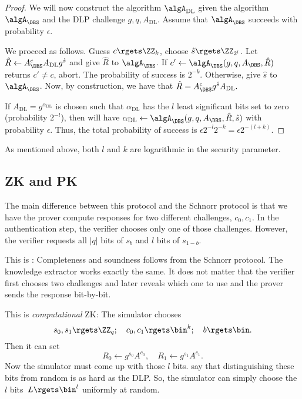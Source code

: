 \begin{proof}
  We will now construct the algorithm \(\algA_{\text{DL}}\) given the algorithm 
  \(\algA_{\DBS}\) and the \ac{DLP} challenge \(g, q, A_{\text{DL}}\).
  Assume that \(\algA_{\DBS}\) succeeds with probability \(\epsilon\).

  We proceed as follows.
  Guess \(c\rgets \ZZ_k\), choose \(\hat s\rgets \ZZ_{2^l}\).
  Let \(\hat R\gets A_{\DBS}^c A_{\text{DL}} g^{\hat s}\) and give
  \(\hat R\) to \(\algA_{\DBS}\).
  If \(c'\gets \algA_{\DBS}(g, q, A_{\DBS}, \hat R)\) returns \(c'\neq c\), 
  abort.
  The probability of success is \(2^{-k}\).
  Otherwise, give \(\hat s\) to \(\algA_{\DBS}\).
  Now, by construction, we have that \(
    \hat R = A_{\DBS}^c g^{\hat s} A_{\text{DL}}.
  \)

  If \(A_{\text{DL}} = g^{\alpha_{\text{DL}}}\) is chosen such that 
  \(\alpha_{\text{DL}}\) has the \(l\) least significant bits set to zero 
  (probability \(2^{-l}\)), then will have \(
    \alpha_{\text{DL}}\gets \algA_{\DBS}(g, q, A_{\DBS}, \hat R, \hat s)
  \) with probability \(\epsilon\).
  Thus, the total probability of success is \(
    \epsilon 2^{-l} 2^{-k} = \epsilon 2^{-(l+k)}.
  \)
\end{proof}

As mentioned above, both \(l\) and \(k\) are logarithmic in the security 
parameter.

\subsection{\Acl*{ZK} and \acl*{PK}}\label{nbit-ZKPK}

The main difference between this protocol and the Schnorr protocol is that we 
have the prover compute responses for two different challenges, \(c_0, c_1\).
In the authentication step, the verifier chooses only one of those challenges.
However, the verifier requests all \(|q|\) bits of \(s_b\) and \(l\) bits of 
\(s_{1-b}\).

This is :
Completeness and soundness follows from the Schnorr protocol.
The knowledge extractor works exactly the same.
It does not matter that the verifier first chooses two challenges and later 
reveals which one to use and the prover sends the response bit-by-bit.

This is \emph{computational} \acl{ZK}:
The simulator chooses \[
  s_0, s_1\rgets \ZZ_q; \quad
  c_0, c_1\rgets \bin^k; \quad
  b\rgets \bin.
\]
Then it can set \[
  R_0\gets g^{s_0} A^{c_0}, \quad
  R_1\gets g^{s_1} A^{c_1}.
\]
Now the simulator must come up with those \(l\) bits.
 say that distinguishing these bits from random 
is as hard as the \ac{DLP}.
So, the simulator can simply choose the \(l\) bits~\(L\rgets \bin^l\) uniformly 
at random.

